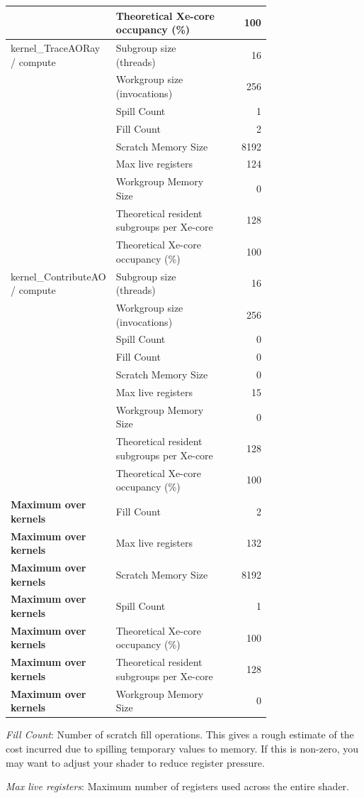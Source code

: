 \begin{longtable}{p{0.30\linewidth}p{0.43\linewidth}r}
 & Theoretical Xe-core occupancy (\%) & 100 \\
\hline
kernel\_TraceAORay / compute & Subgroup size (threads) & 16 \\
 & Workgroup size (invocations) & 256 \\
 & Spill Count & 1 \\
 & Fill Count & 2 \\
 & Scratch Memory Size & 8192 \\
 & Max live registers & 124 \\
 & Workgroup Memory Size & 0 \\
 & Theoretical resident subgroups per Xe-core & 128 \\
 & Theoretical Xe-core occupancy (\%) & 100 \\
\hline
kernel\_ContributeAO / compute & Subgroup size (threads) & 16 \\
 & Workgroup size (invocations) & 256 \\
 & Spill Count & 0 \\
 & Fill Count & 0 \\
 & Scratch Memory Size & 0 \\
 & Max live registers & 15 \\
 & Workgroup Memory Size & 0 \\
 & Theoretical resident subgroups per Xe-core & 128 \\
 & Theoretical Xe-core occupancy (\%) & 100 \\
\hline
\textbf{Maximum over kernels} & Fill Count & 2 \\
\textbf{Maximum over kernels} & Max live registers & 132 \\
\textbf{Maximum over kernels} & Scratch Memory Size & 8192 \\
\textbf{Maximum over kernels} & Spill Count & 1 \\
\textbf{Maximum over kernels} & Theoretical Xe-core occupancy (\%) & 100 \\
\textbf{Maximum over kernels} & Theoretical resident subgroups per Xe-core & 128 \\
\textbf{Maximum over kernels} & Workgroup Memory Size & 0 \\
\hline
\end{longtable}
\noindent\textit{Fill Count}: Number of scratch fill operations.  This gives a rough estimate of the cost incurred due to spilling temporary values to memory.  If this is non-zero, you may want to adjust your shader to reduce register pressure.\par
\noindent\textit{Max live registers}: Maximum number of registers used across the entire shader.\par
